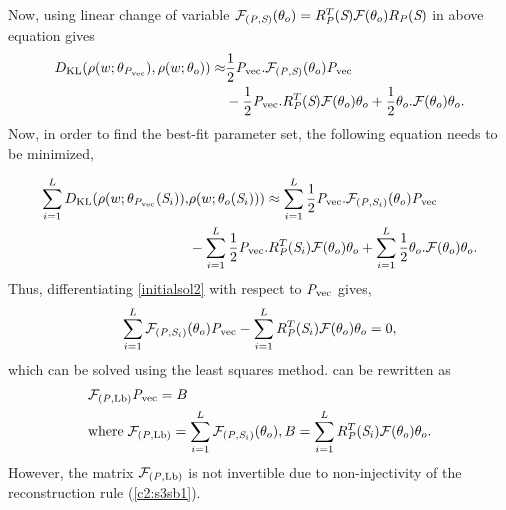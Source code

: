 Now, using linear change of variable ${\mathcal F}_{({\mathit{P}},{\textit{S}})}(\theta_{o})=R_{{\mathit{P}}}^{T}({\textit{S}}){\mathcal F}(\theta_{o})R_{{\mathit{P}}}({\textit{S}})$ in above equation gives 
\begin{equation}
\begin{split}
D_{\text{KL}}(\rho(w;\theta_{{\mathit{P}}_\text{vec}}), \rho(w;\theta_{o})) \approx& \frac{1}{2}{\mathit{P}}_\text{vec}.{\mathcal F}_{({\mathit{P}},{\textit{S}})}(\theta_{o}){\mathit{P}}_\text{vec}\\ & - \frac{1}{2}{\mathit{P}}_\text{vec}.R_{{\mathit{P}}}^{T}({\textit{S}}){\mathcal F}(\theta_{o})\theta_{o} + \frac{1}{2}\theta_{o}.{\mathcal F}(\theta_{o})\theta_{o}.
\end{split}
\label{KLfish5}
\end{equation}
Now, in order to find the best-fit parameter set, the following equation needs to be minimized,
\clearpage

\begin{equation}
\begin{split}
\sum_{i=1}^{L}D_{\text{KL}}(\rho(w;\theta_{{\mathit{P}}_\text{vec}}({\textit{S}}_i)),& \rho(w;\theta_{o}({\textit{S}}_i))) \approx 
\sum_{i=1}^{L}\frac{1}{2}{\mathit{P}}_\text{vec}.{\mathcal F}_{({\mathit{P}},{\textit{S}}_i)}(\theta_{o}){\mathit{P}}_\text{vec}\\ & - \sum_{i=1}^{L}\frac{1}{2}{\mathit{P}}_\text{vec}.R_{{\mathit{P}}}^{T}({\textit{S}}_i){\mathcal F}(\theta_{o})\theta_{o} + \sum_{i=1}^{L}\frac{1}{2}\theta_{o}.{\mathcal F}(\theta_{o})\theta_{o}.
\end{split}
\label{initialsol2}
\end{equation}
Thus, differentiating \cref{initialsol2} with respect to  ${\mathit{P}}_\text{vec}$ gives,
\begin{equation}
\begin{split}
\sum_{i=1}^{L}{\mathcal F}_{({\mathit{P}},{\textit{S}}_i)}(\theta_{o}){\mathit{P}}_\text{vec} - \sum_{i=1}^{L}R_{{\mathit{P}}}^{T}({\textit{S}}_i){\mathcal F}(\theta_{o})\theta_{o} = 0,
\end{split}
\label{initialsol3}
\end{equation}
which can be solved using the least squares method.  can be rewritten as 
\begin{equation}
\begin{split}
&{\mathcal F}_{({\mathit{P}},{\text{Lb}})}{\mathit{P}}_\text{vec} = B \\
&\text{where} \; {\mathcal F}_{({\mathit{P}},{\text{Lb}})} = \sum_{i=1}^{L}{\mathcal F}_{({\mathit{P}},{\textit{S}}_i)}(\theta_{o}), B = \sum_{i=1}^{L}R_{{\mathit{P}}}^{T}({\textit{S}}_i){\mathcal F}(\theta_{o})\theta_{o}.
\end{split}
\label{initialsol4}
\end{equation}
However, the matrix ${\mathcal F}_{({\mathit{P}},{\text{Lb}})}$ is not invertible due to non-injectivity of the reconstruction rule (\cref{c2:s3sb1}). 
